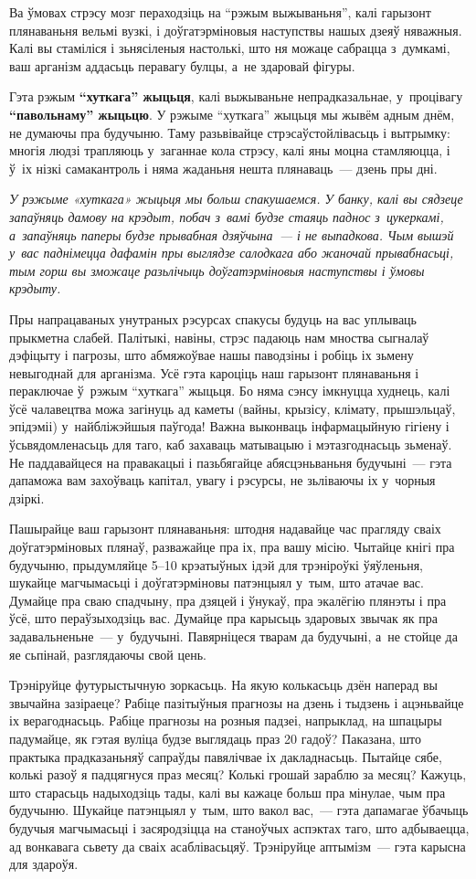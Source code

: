 Ва ўмовах стрэсу мозг пераходзіць на ``рэжым выжываньня'', калі гарызонт плянаваньня вельмі вузкі, і доўгатэрміновыя наступствы нашых дзеяў няважныя. Калі вы стаміліся і зьнясіленыя настолькі, што ня можаце сабрацца з~думкамі, ваш арганізм аддасьць перавагу булцы, а~не здаровай фігуры.

Гэта рэжым \textbf{``хуткага'' жыцьця}, калі выжываньне непрадказальнае, у~процівагу \textbf{``павольнаму'' жыцьцю}. У рэжыме ``хуткага'' жыцьця мы жывём адным днём, не думаючы пра будучыню. Таму разьвівайце стрэсаўстойлівасьць і вытрымку: многія людзі трапляюць у~заганнае кола стрэсу, калі яны моцна стамляюцца, і ў~іх нізкі самакантроль і няма жаданьня нешта плянаваць~--- дзень пры дні.

\emph{У рэжыме «хуткага» жыцьця мы больш спакушаемся. У банку, калі вы сядзеце запаўняць дамову на крэдыт, побач з~вамі будзе стаяць паднос з~цукеркамі, а~запаўняць паперы будзе прывабная дзяўчына~--- і не выпадкова. Чым вышэй у~вас паднімецца дафамін пры выглядзе салодкага або жаночай прывабнасьці, тым горш вы зможаце разьлічыць доўгатэрміновыя наступствы і ўмовы крэдыту.}

Пры напрацаваных унутраных рэсурсах спакусы будуць на вас уплываць прыкметна слабей. Палітыкі, навіны, стрэс падаюць нам мноства сыгналаў дэфіцыту і пагрозы, што абмяжоўвае нашы паводзіны і робіць іх зьмену невыгоднай для арганізма. Усё гэта кароціць наш гарызонт плянаваньня і пераключае ў~рэжым ``хуткага'' жыцьця. Бо няма сэнсу імкнуцца худнець, калі ўсё чалавецтва можа загінуць ад каметы (вайны, крызісу, клімату, прышэльцаў, эпідэміі) у~найбліжэйшыя паўгода! Важна выконваць інфармацыйную гігіену і ўсьвядомленасьць для таго, каб захаваць матывацыю і мэтазгоднасьць зьменаў. Не паддавайцеся на правакацыі і пазьбягайце абясцэньваньня будучыні~--- гэта дапаможа вам захоўваць капітал, увагу і рэсурсы, не зьліваючы іх у~чорныя дзіркі.

Пашырайце ваш гарызонт плянаваньня: штодня надавайце час прагляду сваіх доўгатэрміновых плянаў, разважайце пра іх, пра вашу місію. Чытайце кнігі пра будучыню, прыдумляйце 5--10 крэатыўных ідэй для трэніроўкі ўяўленьня, шукайце магчымасьці і доўгатэрміновы патэнцыял у~тым, што атачае вас. Думайце пра сваю спадчыну, пра дзяцей і ўнукаў, пра экалёгію плянэты і пра ўсё, што пераўзыходзіць вас. Думайце пра карысьць здаровых звычак як пра задавальненьне~--- у~будучыні. Павярніцеся тварам да будучыні, а~не стойце да яе сьпінай, разглядаючы свой цень.

Трэніруйце футурыстычную зоркасьць. На якую колькасьць дзён наперад вы звычайна зазіраеце? Рабіце пазітыўныя прагнозы на дзень і тыдзень і ацэньвайце іх верагоднасьць. Рабіце прагнозы на розныя падзеі, напрыклад, на шпацыры падумайце, як гэтая вуліца будзе выглядаць праз 20 гадоў? Паказана, што практыка прадказаньняў сапраўды павялічвае іх дакладнасьць. Пытайце сябе, колькі разоў я падцягнуся праз месяц? Колькі грошай зараблю за месяц? Кажуць, што старасьць надыходзіць тады, калі вы кажаце больш пра мінулае, чым пра будучыню. Шукайце патэнцыял у~тым, што вакол вас,~--- гэта дапамагае ўбачыць будучыя магчымасьці і засяродзіцца на станоўчых аспэктах таго, што адбываецца, ад вонкавага сьвету да сваіх асаблівасьцяў. Трэніруйце аптымізм~--- гэта карысна для здароўя.

